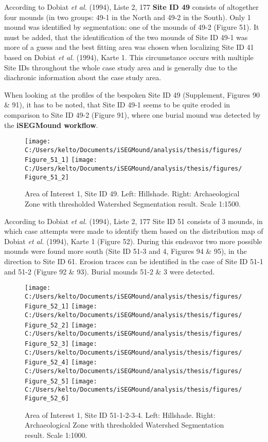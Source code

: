 \documentclass[
  12pt,
]{article}
\begin{document}
According to Dobiat \emph{et al.} (1994), Liste 2, 177 \textbf{Site ID 49} consists of altogether four mounds (in two groups: 49-1 in the North and 49-2 in the South). Only 1 mound was identified by segmentation: one of the mounds of 49-2 (Figure 51). It must be added, that the identification of the two mounds of Site ID 49-1 was more of a guess and the best fitting area was chosen when localizing Site ID 41 based on Dobiat \emph{et al.} (1994), Karte 1. This circumstance occurs with multiple Site IDs throughout the whole case study area and is generally due to the diachronic information about the case study area.

When looking at the profiles of the bespoken Site ID 49 (Supplement, Figures 90 \& 91), it has to be noted, that Site ID 49-1 seems to be quite eroded in comparison to Site ID 49-2 (Figure 91), where one burial mound was detected by the \textbf{iSEGMound workflow}.\\

\begin{figure}
\texttt{[image: C:/Users/kelto/Documents/iSEGMound/analysis/thesis/figures/Figure\_51\_1]} \texttt{[image: C:/Users/kelto/Documents/iSEGMound/analysis/thesis/figures/Figure\_51\_2]} \caption{Area of Interest 1, Site ID 49. Left: Hillshade. Right: Archaeological Zone with thresholded Watershed Segmentation result. Scale 1:1500.}\label{fig:Figure51}
\end{figure}

According to Dobiat \emph{et al.} (1994), Liste 2, 177 Site ID 51 consists of 3 mounds, in which case attempts were made to identify them based on the distribution map of Dobiat \emph{et al.} (1994), Karte 1 (Figure 52). During this endeavor two more possible mounds were found more south (Site ID 51-3 and 4, Figures 94 \& 95), in the direction to Site ID 61. Erosion traces can be identified in the case of Site ID 51-1 and 51-2 (Figure 92 \& 93). Burial mounds 51-2 \& 3 were detected.

\begin{figure}
\texttt{[image: C:/Users/kelto/Documents/iSEGMound/analysis/thesis/figures/Figure\_52\_1]} \texttt{[image: C:/Users/kelto/Documents/iSEGMound/analysis/thesis/figures/Figure\_52\_2]} \texttt{[image: C:/Users/kelto/Documents/iSEGMound/analysis/thesis/figures/Figure\_52\_3]} \texttt{[image: C:/Users/kelto/Documents/iSEGMound/analysis/thesis/figures/Figure\_52\_4]} \texttt{[image: C:/Users/kelto/Documents/iSEGMound/analysis/thesis/figures/Figure\_52\_5]} \texttt{[image: C:/Users/kelto/Documents/iSEGMound/analysis/thesis/figures/Figure\_52\_6]} \caption{Area of Interest 1, Site ID 51-1-2-3-4. Left: Hillshade. Right: Archaeological Zone with thresholded Watershed Segmentation result. Scale 1:1000.}\label{fig:Figure52}
\end{figure}
\end{document}
